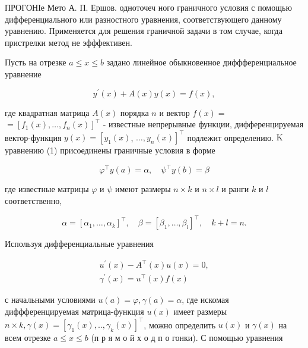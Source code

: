 \documentclass[10pt]{article}
\begin{document}
ПРОГОНІе Мето А. П. Ершов. одноточеч ного граничного условия с помощью дифференциального или разностного уравнения, соответствующего данному уравнению. Применяется для решения граничной задачи в том случае, когда пристрелки метод не эфффективен.



Пусть на отрезке $a \leqslant x \leqslant b$ задано линейное обыкновенное диффференциальное уравнение



\[

y^{\prime}(x)+A(x) y(x)=f(x),

\]



где квадратная матрица $A(x)$ порядка $n$ и вектор $f(x)=$ $=\left[f_{1}(x), \ldots, f_{n}(x)\right]^{\top}$ - известные непрерывные функции, дифференцируемая вектор-функция $y(x)=\left[y_{1}(x)\right.$, $\left.\ldots, y_{n}(x)\right]^{\top}$ подлежит определению. $\mathrm{K}$ уравнению (1) присоединены граничные условия в форме



\[

\varphi^{\top} y(a)=\alpha, \quad \psi^{\top} y(b)=\beta

\]



где известные матрицы $\varphi$ и $\psi$ имеют размеры $n \times k$ и $n \times l$ и ранги $k$ и $l$ соответственно,



\[

\alpha=\left[\alpha_{1}, \ldots, \alpha_{k}\right]^{\top}, \quad \beta=\left[\beta_{1}, \ldots, \beta_{l}\right]^{\top}, \quad k+l=n .

\]



Используя дифференциальные уравнения



\[

\begin{gathered}

u^{\prime}(x)-A^{\top}(x) u(x)=0, \\

\gamma^{\prime}(x)=u^{\top}(x) f(x)

\end{gathered}

\]



с начальными условиями $u(a)=\varphi, \gamma(a)=\alpha$, где искомая диффференцируемая матрица-функция $u(x)$ имеет размеры $n \times k, \gamma(x)=\left[\gamma_{1}(x), . ., \gamma_{k}(x)\right]^{\top}$, можно определить $u(x)$ и $\gamma(x)$ на всем отрезке $a \leqslant x \leqslant b$ (п р я м о й х о д п о гонки). С помощью уравнения
\end{document}
